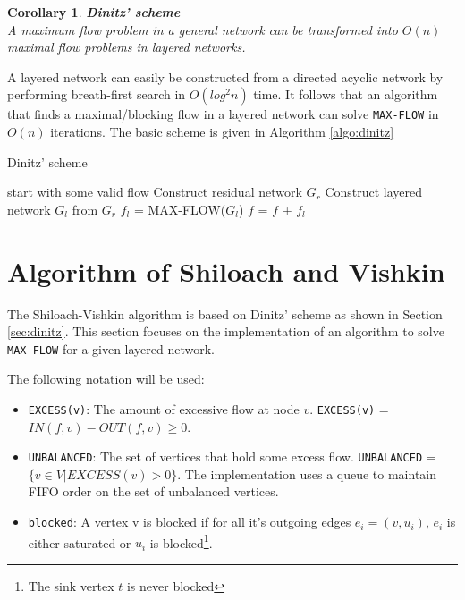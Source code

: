 \documentclass[a4paper,10pt, twocolumn]{article}
\newtheorem{corollary}[lemma]{Corollary}
\begin{document}
\begin{corollary}
\textbf{Dinitz' scheme} \cite{dinitz70} \\
A maximum flow problem in a general network can be transformed into $O(n)$ maximal flow problems in layered networks.
\end{corollary}

A layered network can easily be constructed from a directed acyclic network by performing breath-first search in  $O(log^{2}n)$ time. It follows that an algorithm that finds a maximal/blocking flow in a layered network can solve \lstinline|MAX-FLOW| in $O(n)$ iterations. The basic scheme is given in Algorithm \ref{algo:dinitz}

\begin{algorithm}
\caption{Dinitz' scheme}
\label{algo:dinitz}
\begin{algorithmic}[1]
	\State start with some valid flow 
	 \Comment{\textcolor{OliveGreen}{$O(n)$}}	
		\State Construct residual network $G_r$ \Comment{\textcolor{OliveGreen}{$O(n)$, $p=O(n)$}}
		\State Construct layered network $G_l$ from $G_r$ 
		\State $f_l$ = MAX-FLOW($G_l$)  
		\State $f$ = $f$ + $f_l$ \Comment{\textcolor{OliveGreen}{$O(n)$}}
	\EndWhile
	\EndFunction
\end{algorithmic}
\end{algorithm}

\section{Algorithm of Shiloach and Vishkin}
\label{sec:shiloach}
The Shiloach-Vishkin algorithm is based on Dinitz' scheme as shown in Section \ref{sec:dinitz}. This section focuses on the implementation of an algorithm to solve \lstinline|MAX-FLOW| for a given layered network.

The following notation will be used:
\begin{itemize}
	\item \lstinline|EXCESS(v)|: The amount of excessive flow at node $v$. \lstinline|EXCESS(v)| = $IN(f,v) - OUT(f,v) \geq 0$.
	\item \lstinline|UNBALANCED|: The set of vertices that hold some excess flow. \lstinline|UNBALANCED| = $\{v \in V \lvert EXCESS(v) > 0 \}$. The implementation uses a queue to maintain FIFO order on the set of unbalanced vertices.
	\item \lstinline|blocked|: A vertex v is blocked if for all it's outgoing edges $e_i = (v, u_i)$, $e_i$ is either saturated or $u_i$ is blocked\footnote{The sink vertex $t$ is never blocked}. 
\end{itemize}
\end{document}
